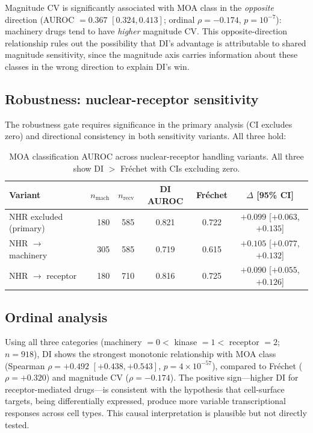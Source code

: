 \documentclass[11pt]{article}
\begin{document}
Magnitude CV is significantly associated with MOA class in the
\emph{opposite} direction (AUROC $= 0.367$ $[0.324, 0.413]$; ordinal
$\rho = -0.174$, $p = 10^{-7}$): machinery drugs tend to have
\emph{higher} magnitude CV. This opposite-direction relationship rules
out the possibility that DI's advantage is attributable to shared
magnitude sensitivity, since the magnitude axis carries information
about these classes in the wrong direction to explain DI's win.

\subsection{Robustness: nuclear-receptor sensitivity}

The robustness gate requires significance in the primary analysis (CI
excludes zero) and directional consistency in both sensitivity variants.
All three hold:

\begin{table}[h]
\centering
\caption{MOA classification AUROC across nuclear-receptor handling
variants. All three show DI $>$ Fr\'{e}chet with CIs excluding zero.}
\label{tab:nhr_sensitivity}
\begin{tabular}{lrrccc}
\toprule
Variant & $n_{\text{mach}}$ & $n_{\text{recv}}$ & DI AUROC & Fr\'{e}chet & $\Delta$ [95\% CI] \\
\midrule
NHR excluded (primary) & 180 & 585 & 0.821 & 0.722 & $+0.099$ [$+0.063$, $+0.135$] \\
NHR $\to$ machinery & 305 & 585 & 0.719 & 0.615 & $+0.105$ [$+0.077$, $+0.132$] \\
NHR $\to$ receptor & 180 & 710 & 0.816 & 0.725 & $+0.090$ [$+0.055$, $+0.126$] \\
\bottomrule
\end{tabular}
\end{table}

\subsection{Ordinal analysis}

Using all three categories (machinery $= 0 <$ kinase $= 1 <$ receptor
$= 2$; $n = 918$), DI shows the strongest monotonic relationship with
MOA class (Spearman $\rho = +0.492$ $[+0.438, +0.543]$, $p = 4 \times
10^{-57}$), compared to Fr\'{e}chet ($\rho = +0.320$) and magnitude CV
($\rho = -0.174$). The positive sign---higher DI for receptor-mediated
drugs---is consistent with the hypothesis that cell-surface targets,
being differentially expressed, produce more variable transcriptional
responses across cell types. This causal interpretation is plausible
but not directly tested.
\end{document}
